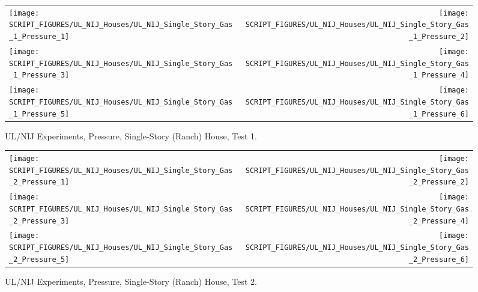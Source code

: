 \newpage

\begin{figure}[p]
\begin{tabular*}{\textwidth}{l@{\extracolsep{\fill}}r}
\texttt{[image: SCRIPT\_FIGURES/UL\_NIJ\_Houses/UL\_NIJ\_Single\_Story\_Gas\_1\_Pressure\_1]} &
\texttt{[image: SCRIPT\_FIGURES/UL\_NIJ\_Houses/UL\_NIJ\_Single\_Story\_Gas\_1\_Pressure\_2]} \\
\texttt{[image: SCRIPT\_FIGURES/UL\_NIJ\_Houses/UL\_NIJ\_Single\_Story\_Gas\_1\_Pressure\_3]} &
\texttt{[image: SCRIPT\_FIGURES/UL\_NIJ\_Houses/UL\_NIJ\_Single\_Story\_Gas\_1\_Pressure\_4]} \\
\texttt{[image: SCRIPT\_FIGURES/UL\_NIJ\_Houses/UL\_NIJ\_Single\_Story\_Gas\_1\_Pressure\_5]} &
\texttt{[image: SCRIPT\_FIGURES/UL\_NIJ\_Houses/UL\_NIJ\_Single\_Story\_Gas\_1\_Pressure\_6]} \\
\end{tabular*}
\caption[UL/NIJ Experiments, Pressure, Single-Story (Ranch) House, Test 1]{UL/NIJ Experiments, Pressure, Single-Story (Ranch) House, Test 1.}
\label{UL_NIJ_Pres_Ranch_1}
\end{figure}

\begin{figure}[p]
\begin{tabular*}{\textwidth}{l@{\extracolsep{\fill}}r}
\texttt{[image: SCRIPT\_FIGURES/UL\_NIJ\_Houses/UL\_NIJ\_Single\_Story\_Gas\_2\_Pressure\_1]} &
\texttt{[image: SCRIPT\_FIGURES/UL\_NIJ\_Houses/UL\_NIJ\_Single\_Story\_Gas\_2\_Pressure\_2]} \\
\texttt{[image: SCRIPT\_FIGURES/UL\_NIJ\_Houses/UL\_NIJ\_Single\_Story\_Gas\_2\_Pressure\_3]} &
\texttt{[image: SCRIPT\_FIGURES/UL\_NIJ\_Houses/UL\_NIJ\_Single\_Story\_Gas\_2\_Pressure\_4]} \\
\texttt{[image: SCRIPT\_FIGURES/UL\_NIJ\_Houses/UL\_NIJ\_Single\_Story\_Gas\_2\_Pressure\_5]} &
\texttt{[image: SCRIPT\_FIGURES/UL\_NIJ\_Houses/UL\_NIJ\_Single\_Story\_Gas\_2\_Pressure\_6]} \\
\end{tabular*}
\caption[UL/NIJ Experiments, Pressure, Single-Story (Ranch) House, Test 2]{UL/NIJ Experiments, Pressure, Single-Story (Ranch) House, Test 2.}
\label{UL_NIJ_Pres_Ranch_2}
\end{figure}

